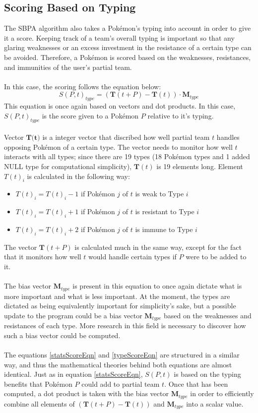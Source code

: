 \documentclass{article}
\begin{document}
\subsection{Scoring Based on Typing}
The SBPA algorithm also takes a Pok\'emon's typing into account in order to give it a score. Keeping track of a team's overall typing is important so that any glaring weaknesses or an excess investment in the resistance of a certain type can be avoided. Therefore, a Pok\'emon is scored based on the weaknesses, resistances, and immunities of the user's partial team.\\\\
In this case, the scoring follows the equation below:
\begin{equation}\label{typeScoreEqn}
	S(P,t)_{type}=(\textbf{T}(t+P)-\textbf{T}(t))\cdot\textbf{M}_{type}
\end{equation}
This equation is once again based on vectors and dot products. In this case, $S(P,t)_{type}$ is the score given to a Pok\'emon $P$ relative to it's typing.\\\\
Vector $\textbf{T(t)}$ is a integer vector that discribed how well partial team $t$ handles opposing Pok\'emon of a certain type. The vector needs to monitor how well $t$ interacts with all types; since there are 19 types (18 Pok\'emon types and 1 added NULL type for computational simplicity), $\textbf{T}(t)$ is 19 elements long. Element $T(t)_i$ is calculated in the following way:
\begin{itemize}
	\item $T(t)_i=T(t)_i-1$ if Pok\'emon $j$ of $t$ is weak to Type $i$
	\item $T(t)_i=T(t)_i+1$ if Pok\'emon $j$ of $t$ is resistant to Type $i$
	\item $T(t)_i=T(t)_i+2$ if Pok\'emon $j$ of $t$ is immune to Type $i$
\end{itemize}
The vector $\textbf{T}(t+P)$ is calculated much in the same way, except for the fact that it monitors how well $t$ would handle certain types if $P$ were to be added to it.\\\\
The bias vector $\textbf{M}_{type}$ is present in this equation to once again dictate what is more important and what is less important. At the moment, the types are dictated as being equivalently important for simplicity's sake, but a possible update to the program could be a bias vector $\textbf{M}_{type}$ based on the weaknesses and resistances of each type. More research in this field is necessary to discover how such a bias vector could be computed.\\\\
The equations \ref{statsScoreEqn} and \ref{typeScoreEqn} are structured in a similar way, and thus the mathematical theories behind both equations are almost identical. Just as in equation \ref{statsScoreEqn}, $S(P,t)$ is based on the typing benefits that Pok\'emon $P$ could add to partial team $t$. Once that has been computed, a dot product is taken with the bias vector $\textbf{M}_{type}$ in order to efficiently combine all elements of $(\textbf{T}(t+P)-\textbf{T}(t))$ and $\textbf{M}_{type}$ into a scalar value.
\end{document}
